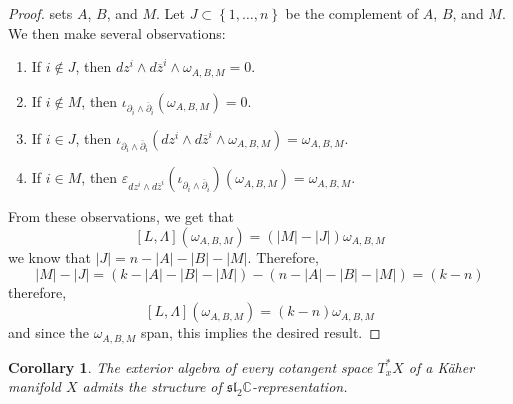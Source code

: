 \documentclass[psamsfonts, 12pt]{amsart}
\newtheorem{cor}[thm]{Corollary}
\theoremstyle{definition}
\theoremstyle{remark}
\renewcommand{\sl}{\mathfrak{sl}}
\newcommand{\C}{\mathbb{C}}
\newcommand{\dbar}{\overline{\partial}}
\newcommand{\zbar}{\overline{z}}
\newcommand{\set}[1]{\left\lbrace #1 \right\rbrace}
\begin{document}
\begin{proof}
sets $A$, $B$, and $M$. Let $J \subset \set{1,\ldots, n}$ be the complement of
$A$, $B$, and $M$. We then make several observations:
\begin{enumerate}
  \item If $i \notin J$, then $dz^i\wedge d\zbar^i \wedge \omega_{A,B,M} = 0$.
  \item If $i \notin M$, then $\iota_{\partial_i\wedge\dbar_i}(\omega_{A,B,M}) = 0$.
  \item If $i \in J$, then
  $\iota_{\partial_i\wedge\dbar_i}(dz^i\wedge d\zbar^i\wedge\omega_{A,B,M})
  = \omega_{A,B,M}$.
  \item If $i \in M$, then
  $\varepsilon_{dz^i\wedge d\zbar^i}(\iota_{\partial_i\wedge\dbar_i})(\omega_{A,B,M})
  = \omega_{A,B,M}$.
\end{enumerate}
From these observations, we get that
\[
[L,\Lambda](\omega_{A,B,M}) = (|M|-|J|)\omega_{A,B,M}
\]
we know that $|J| = n - |A| - |B| - |M|$. Therefore,
\[
|M| - |J| = (k - |A| - |B| - |M|) - (n - |A| - |B| - |M|) = (k-n)
\]
therefore,
\[
[L,\Lambda](\omega_{A,B,M}) = (k-n)\omega_{A,B,M}
\]
and since the $\omega_{A,B,M}$ span, this implies the desired result.
\end{proof}
%
\begin{cor}
The exterior algebra of every cotangent space $T^*_xX$ of a K\"aher manifold $X$ admits
the structure of $\sl_2\C$-representation.
\end{cor}
%
\end{document}
